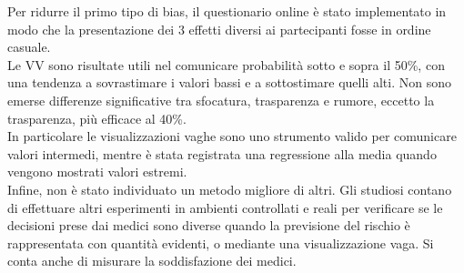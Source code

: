 Per ridurre il primo tipo di bias, il questionario online è stato implementato in modo che la presentazione dei 3 effetti diversi ai partecipanti fosse in ordine casuale.\\
Le VV sono risultate utili nel comunicare probabilità sotto e sopra il 50\%, con una tendenza a sovrastimare i valori bassi e a sottostimare quelli alti. Non sono emerse differenze significative tra sfocatura, trasparenza e rumore, eccetto la trasparenza, più efficace al 40\%.\\
In particolare le visualizzazioni vaghe sono uno strumento valido per comunicare valori intermedi, mentre è stata registrata una regressione alla media quando vengono mostrati valori estremi.\\
Infine, non è stato individuato un metodo migliore di altri. Gli studiosi contano di effettuare altri esperimenti in ambienti controllati e reali per verificare se le decisioni prese dai medici sono diverse quando la previsione del rischio è rappresentata con quantità evidenti, o mediante una visualizzazione vaga. Si conta anche di misurare la soddisfazione dei medici.\\

